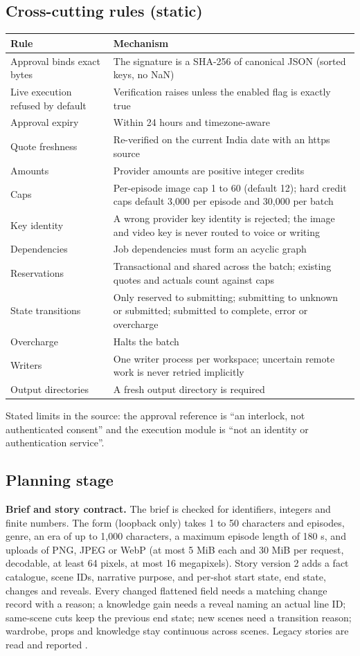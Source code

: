 \documentclass[11pt,a4paper]{article}
\newcommand{\code}[1]{\texttt{\detokenize{#1}}}
\begin{document}
\subsection{Cross-cutting rules (static)}
\begin{longtable}{@{}P{5.8cm}P{9.7cm}@{}}
\toprule \textbf{Rule} & \textbf{Mechanism}\\ \midrule\endhead
Approval binds exact bytes & The signature is a SHA-256 of canonical JSON (sorted keys, no NaN)\\
Live execution refused by default & Verification raises unless the enabled flag is exactly true\\
Approval expiry & Within 24 hours and timezone-aware\\
Quote freshness & Re-verified on the current India date with an https source\\
Amounts & Provider amounts are positive integer credits\\
Caps & Per-episode image cap 1 to 60 (default 12); hard credit caps default 3,000 per episode and 30,000 per batch\\
Key identity & A wrong provider key identity is rejected; the image and video key is never routed to voice or writing\\
Dependencies & Job dependencies must form an acyclic graph\\
Reservations & Transactional and shared across the batch; existing quotes and actuals count against caps\\
State transitions & Only reserved to submitting; submitting to unknown or submitted; submitted to complete, error or overcharge\\
Overcharge & Halts the batch\\
Writers & One writer process per workspace; uncertain remote work is never retried implicitly\\
Output directories & A fresh output directory is required\\
\bottomrule
\end{longtable}
Stated limits in the source: the approval reference is ``an interlock, not authenticated consent'' and the execution module is ``not an identity or authentication service''.

\subsection{Planning stage}
\textbf{Brief and story contract.} The brief is checked for identifiers, integers and finite numbers. The form (loopback only) takes 1 to 50 characters and episodes, genre, an era of up to 1,000 characters, a maximum episode length of 180 s, and uploads of PNG, JPEG or WebP (at most 5 MiB each and 30 MiB per request, decodable, at least 64 pixels, at most 16 megapixels). Story version 2 adds a fact catalogue, scene IDs, narrative purpose, and per-shot start state, end state, changes and reveals. Every changed flattened field needs a matching change record with a reason; a knowledge gain needs a reveal naming an actual line ID; same-scene cuts keep the previous end state; new scenes need a transition reason; wardrobe, props and knowledge stay continuous across scenes. Legacy stories are read and reported \code{legacy_unchecked}.
\end{document}
